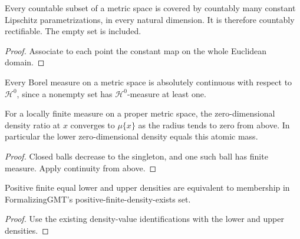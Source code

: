 \begin{lemma}
\label{lem:countable-carrier}
Every countable subset of a metric space is covered by countably many constant
Lipschitz parametrizations, in every natural dimension. It is therefore countably
rectifiable. The empty set is included.
\end{lemma}
\begin{proof}
Associate to each point the constant map on the whole Euclidean domain.
\end{proof}

\begin{lemma}
\label{lem:zero-hausdorff-ac}
Every Borel measure on a metric space is absolutely continuous with respect to
$\mathcal H^0$, since a nonempty set has $\mathcal H^0$-measure at least one.
\end{lemma}

\begin{lemma}
\label{lem:zero-density-atoms}
For a locally finite measure on a proper metric space, the zero-dimensional
density ratio at $x$ converges to $\mu\{x\}$ as the radius tends to zero from above.
In particular the lower zero-dimensional density equals this atomic mass.
\end{lemma}
\begin{proof}
Closed balls decrease to the singleton, and one such ball has finite measure.
Apply continuity from above.
\end{proof}

\begin{lemma}
\label{lem:density-bridge}
Positive finite equal lower and upper densities are equivalent to membership in
FormalizingGMT's positive-finite-density-exists set.
\end{lemma}
\begin{proof}
Use the existing density-value identifications with the lower and upper densities.
\end{proof}

